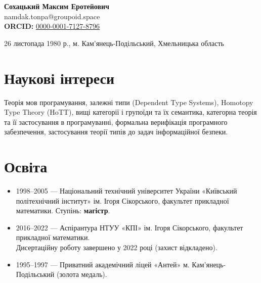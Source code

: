 \documentclass{article}
\begin{document}
\begin{center}
    {\LARGE\bfseries Сохацький Максим Еротейович}\\[0.4em]
    {\large namdak.tonpa@groupoid.space}\\[0.2em]
    \textbf{ORCID:} \href{https://orcid.org/0000-0001-7127-8796}{0000-0001-7127-8796}
\end{center}

\vspace{0.6em}

\begin{center}
    \small 26 листопада 1980 р., м. Кам'янець-Подільський, Хмельницька область
\end{center}

\vspace{0.8em}

\section{Наукові інтереси}
Теорія мов програмування, залежні типи (Dependent Type Systems), Homotopy Type Theory (HoTT),
вищі категорії і групоїди та їх семантика, категорна теорія та її застосування в програмуванні,
формальна верифікація програмного забезпечення, застосування теорії типів до задач інформаційної безпеки.

\section{Освіта}
\begin{itemize}[leftmargin=*, label={}]
    \item 1998--2005 — Національний технічний університет України «Київський політехнічний інститут» ім. Ігоря Сікорського, факультет прикладної математики.
          Ступінь: \textbf{магістр}.
    \item 2016--2022 — Аспірантура НТУУ «КПІ» ім. Ігоря Сікорського, факультет прикладної математики. \\
          Дисертаційну роботу завершено у 2022 році (захист відкладено).
    \item 1995--1997 — Приватний академічний ліцей «Антей» м. Кам'янець-Подільський (золота медаль).
\end{itemize}
\end{document}

